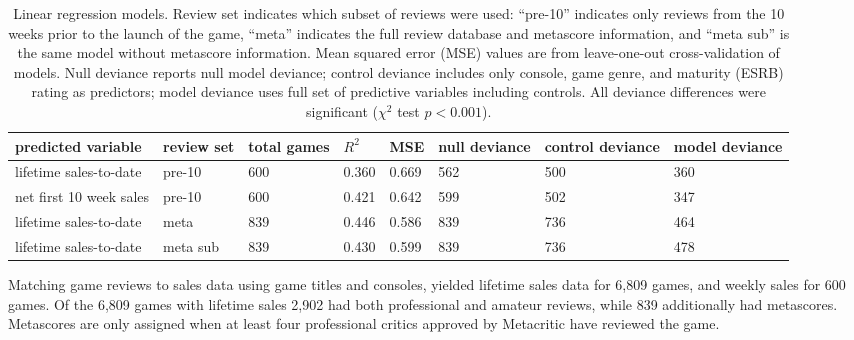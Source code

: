 \documentclass{sig-alternate}
\begin{document}
\begin{table}[tb]
\centering
\small
\sffamily
\begin{tabular}{llllllll}
predicted variable & review set & total games & $R^2$ & MSE & null deviance & control deviance & model deviance \\ 
\midrule lifetime sales-to-date & pre-10 & 600 & 0.360 & 0.669 & 562 & 500 & 360\\ 
net first 10 week sales & pre-10 & 600 & 0.421 & 0.642 & 599 & 502 & 347\\ 
lifetime sales-to-date & meta & 839 & 0.446 & 0.586 & 839 & 736 & 464\\ 
lifetime sales-to-date & meta sub & 839 & 0.430 & 0.599 & 839 & 736 & 478\\ 
\end{tabular}
\caption{Linear regression models. Review set indicates which subset of reviews were used:
``pre-10'' indicates only reviews from the 10 weeks prior to the launch of the game,
``meta'' indicates the full review database and metascore information, and ``meta sub'' is the same model without metascore information. 
Mean squared error (MSE) values are from leave-one-out cross-validation of models. Null deviance reports null model deviance; control deviance includes only console, game genre, and maturity (ESRB) rating as predictors; model deviance uses full set of predictive variables including controls. All deviance differences were significant ($\chi^2$ test $p < 0.001$).}
\label{tab:regression_models}
\end{table}

Matching game reviews to sales data using game titles and consoles, yielded lifetime sales data for 6,809 games, and weekly sales for 600 games. Of the 6,809 games with lifetime sales 2,902 had both professional and amateur reviews, while 839 additionally had metascores. Metascores are only assigned when at least four professional critics approved by Metacritic have reviewed the game.
\end{document}

